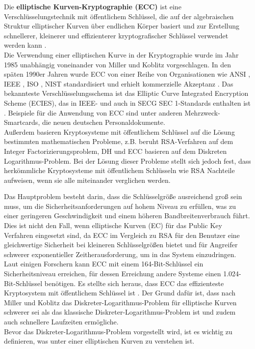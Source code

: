 Die \textbf{elliptische Kurven-Kryptographie (ECC)} ist eine Verschlüsselungstechnik mit öffentlichem Schlüssel, 
die auf der algebraischen Struktur elliptischer Kurven über endlichen Körper basiert \cite{mihNita} und zur Erstellung schnellerer, kleinerer und effizienterer kryptografischer Schlüssel verwendet werden kann \cite{khan}.\\

Die Verwendung einer elliptischen Kurve in der Kryptographie wurde im Jahr 1985 unabhängig voneinander von Miller \cite{miller} und Koblitz \cite{koblitz} vorgeschlagen. In den späten 1990er Jahren wurde ECC von einer Reihe von Organisationen wie ANSI \cite{ansi}, IEEE \cite{ieee}, ISO \cite{iso}, NIST \cite{nist} standardisiert und erhielt kommerzielle Akzeptanz \cite{GaMoDa}.
Das bekannteste Verschlüsselungsschema ist das Elliptic Curve Integrated Encryption Scheme (ECIES), das in IEEE- und auch in SECG SEC 1-Standards enthalten ist \cite{marKaur}. Beispiele für die Anwendung von ECC sind unter anderen Mehrzweck-Smartcards, die  neuen  deutschen  Personaldokumente\cite{merLo}.\\

Außerdem basieren Kryptosysteme mit öffentlichem Schlüssel auf die Lösung bestimmten mathematischen Probleme, z.B. beruht RSA-Verfahren auf dem Integer Factorizierungsproblem, DH und ECC basieren auf dem Diskreten Logarithmus-Problem. Bei der Lösung dieser Probleme stellt sich jedoch fest, dass herkömmliche Kryptosysteme mit öffentlichem Schlüsseln wie RSA Nachteile aufweisen, wenn sie alle miteinander verglichen werden.

Das Hauptproblem besteht darin, dass die Schlüsselgröße ausreichend groß sein muss, um die Sicherheitsanforderungen auf hohem Niveau zu erfüllen, was zu einer geringeren Geschwindigkeit und einem höheren Bandbreitenverbrauch führt.\\

Dies ist nicht den Fall, wenn elliptische Kurven (EC) für das Public Key Verfahren eingesetzt sind, da ECC im Vergleich zu RSA für den Benutzer eine gleichwertige Sicherheit bei kleineren Schlüsselgrößen bietet und für Angreifer schwerer exponentieller Zeitherausforderung, um in das System einzudringen\cite{GaMoDa}.\\

Laut einigen Forschern kann ECC mit einem 164-Bit-Schlüssel ein Sicherheitsniveau erreichen, für dessen Erreichung andere Systeme einen 1.024-Bit-Schlüssel benötigen\cite{khan}. Es stellte sich heraus, dass ECC das effizienteste Kryptosystem mit öffentlichem Schlüssel ist \cite{naRaj}.
Der Grund dafür ist, dass nach Miller und Koblitz das Diskreter-Logarithmus-Problem für elliptische Kurven schwerer sei als das klassische Diskreter-Logarithmus-Problem ist und zudem auch schnellere Laufzeiten ermögliche.\\
Bevor das Diskreter-Logarithmus-Problem vorgestellt wird, ist es wichtig zu definieren, was unter einer elliptischen Kurven zu verstehen ist. 

